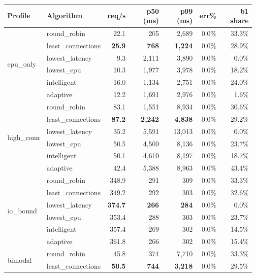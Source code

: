 \documentclass[12pt]{article}
\begin{document}
\begin{table}[H]
\centering
\small
\begin{tabular}{llrrrrr}
\toprule
Profile & Algorithm & req/s & p50 (ms) & p99 (ms) & err\% & b1 share \\
\midrule
\multirow{6}{*}{cpu\_only}
  & round\_robin       & 22.1 & 205   & 2{,}689  & 0.0\% & 33.3\% \\
  & least\_connections & \textbf{25.9} & \textbf{768} & \textbf{1{,}224} & 0.0\% & 28.9\% \\
  & lowest\_latency    &  9.3 & 2{,}111 & 3{,}890 & 0.0\% &  0.0\% \\
  & lowest\_cpu        & 10.3 & 1{,}977 & 3{,}978 & 0.0\% & 18.2\% \\
  & intelligent        & 16.0 & 1{,}134 & 2{,}751 & 0.0\% & 24.0\% \\
  & adaptive           & 12.2 & 1{,}691 & 2{,}976 & 0.0\% &  1.6\% \\
\midrule
\multirow{6}{*}{high\_conn}
  & round\_robin       & 83.1 & 1{,}551 & 8{,}934 & 0.0\% & 30.6\% \\
  & least\_connections & \textbf{87.2} & \textbf{2{,}242} & \textbf{4{,}838} & 0.0\% & 29.2\% \\
  & lowest\_latency    & 35.2 & 5{,}591 & 13{,}013 & 0.0\% &  0.0\% \\
  & lowest\_cpu        & 50.5 & 4{,}500 & 8{,}136 & 0.0\% & 23.7\% \\
  & intelligent        & 50.1 & 4{,}610 & 8{,}197 & 0.0\% & 18.7\% \\
  & adaptive           & 42.4 & 5{,}388 & 8{,}963 & 0.0\% & 43.4\% \\
\midrule
\multirow{6}{*}{io\_bound}
  & round\_robin       & 348.9 & 291 & 309 & 0.0\% & 33.3\% \\
  & least\_connections & 349.2 & 292 & 303 & 0.0\% & 32.6\% \\
  & lowest\_latency    & \textbf{374.7} & \textbf{266} & \textbf{284} & 0.0\% &  0.0\% \\
  & lowest\_cpu        & 353.4 & 288 & 303 & 0.0\% & 23.7\% \\
  & intelligent        & 357.4 & 269 & 302 & 0.0\% & 14.5\% \\
  & adaptive           & 361.8 & 266 & 302 & 0.0\% & 15.4\% \\
\midrule
\multirow{6}{*}{bimodal}
  & round\_robin       & 45.8 &   374 & 7{,}710  & 0.0\% & 33.3\% \\
  & least\_connections & \textbf{50.5} & \textbf{744} & \textbf{3{,}218} & 0.0\% & 29.5\% \\

\end{tabular}
\end{table}
\end{document}
